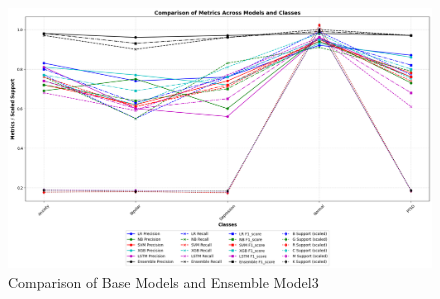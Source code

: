 \begin{figure}[h!]  
    \centering
    \includegraphics[width=1.0\textwidth]{Images/EM3 RESULT.png}  
    \caption{Comparison of Base Models and Ensemble Model3}
    \label{lstm arch}  %
\end{figure}


